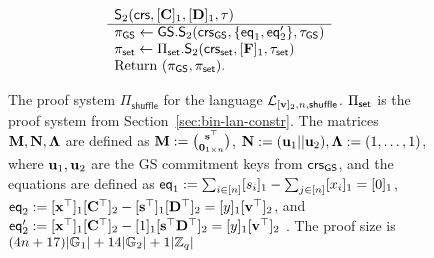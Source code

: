 \begin{figure}
\begin{\algSize}
$$\begin{array}{l}
\begin{array}{l}
\\
\end{array}
\\
\begin{array}{l}
{\mathsf{S}_2(\mathsf{crs},[\mathbf{{C}}]_1,[\mathbf{{D}}]_1,\tau)}\\
\hline
\pi_{\mathsf{GS}}\gets {\mathsf{GS}}.\mathsf{S}_2(\mathsf{crs}_{\mathsf{GS}},\{\mathsf{eq}_1,\mathsf{eq}'_2\},\tau_{\mathsf{GS}})\\
\pi_{\mathsf{set}}\gets \Pi_{\mathsf{set}}.\mathsf{S}_2(\mathsf{crs}_{\mathsf{set}},[\mathbf{{F}}]_1,\tau_{\mathsf{set}})\\
\text{Return }  (\pi_{\mathsf{GS}},\pi_{\mathsf{set}}).
\end{array}
\end{array}
$$
\end{\algSize}
\caption{The proof system $\Pi_\mathsf{shuffle}$ for the language $\mathcal{L}_{[\mathbf{v}]_2,n,\mathsf{shuffle}}$. $\Pi_{\mathsf{set}}$ is the proof system from Section~\ref{sec:bin-lan-constr}. The matrices $\mathbf{{M}},\mathbf{{N}},\mathbf{{\Lambda}}$ are defined as
$\mathbf{{M}}:=\binom{\mathbf{s}^\top}{\mathbf{{0}}_{1\times n}}$,
$\mathbf{{N}}:=(\mathbf{u}_1||\mathbf{u}_2),\mathbf{{\Lambda}}:= (1,\ldots,1)$, where $\mathbf{u}_1,\mathbf{u}_2$ are the GS commitment keys from $\mathsf{crs}_{\mathsf{GS}}$, and the equations are defined as $\mathsf{eq}_1:= \sum_{i\in[n]}[s_i]_1-\sum_{j\in[n]}[{x}_i]_1 = [0]_1$, $\mathsf{eq}_2:= [\mathbf{x}^\top]_1[\mathbf{{C}}^\top]_2-[\mathbf{s}^\top]_1[\mathbf{{D}}^\top]_2=[y]_1[\mathbf{v}^\top]_2$, and $\mathsf{eq}'_2:= [\mathbf{x}^\top]_1[\mathbf{{C}}^\top]_2-[1]_1[\mathbf{s}^\top\mathbf{{D}}^\top]_2=[y]_1[\mathbf{v}^\top]_2$   
. The proof size is $(4n+17)|\mathbb{G}_1|+14|\mathbb{G}_2|+1|\mathbb{Z}_q|$
\label{fig:shuffles}}
\end{figure}

